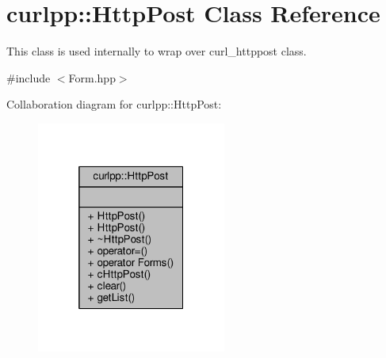 \hypertarget{classcurlpp_1_1HttpPost}{\section{curlpp\-:\-:Http\-Post Class Reference}
\label{classcurlpp_1_1HttpPost}
}


This class is used internally to wrap over curl\-\_\-httppost class.  




{\ttfamily \#include $<$Form.\-hpp$>$}



Collaboration diagram for curlpp\-:\-:Http\-Post\-:
\nopagebreak
\begin{figure}[H]
\begin{center}
\leavevmode
\includegraphics[width=176pt]{classcurlpp_1_1HttpPost__coll__graph}
\end{center}
\end{figure}
